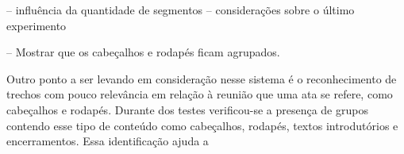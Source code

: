 


























-- influência da quantidade de segmentos
-- considerações sobre o último experimento


-- Mostrar que os cabeçalhos e rodapés ficam agrupados.


Outro ponto a ser levando em consideração nesse sistema é o reconhecimento de trechos com pouco relevância em relação à reunião que uma ata se refere, como cabeçalhos e rodapés. Durante dos testes verificou-se a presença de grupos contendo esse tipo de conteúdo como cabeçalhos, rodapés, textos introdutórios e encerramentos. Essa identificação ajuda a 







